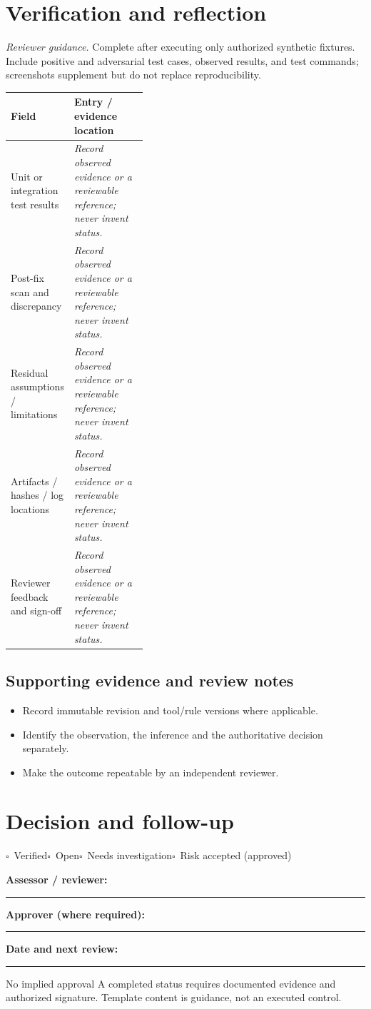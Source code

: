 \documentclass[10pt,letterpaper]{article}
\newcommand{\checkbox}{\(\square\)}
\newcommand{\blankline}{\noindent\rule{\linewidth}{0.35pt}\par\vspace{4pt}}
\begin{document}
\section{Verification and reflection}
\textit{Reviewer guidance.} Complete after executing only authorized synthetic fixtures. Include positive and adversarial test cases, observed results, and test commands; screenshots supplement but do not replace reproducibility.
\begin{tabularx}{\linewidth}{@{}p{0.38\linewidth}Y@{}}
\toprule Field & Entry / evidence location\\\midrule
Unit or integration test results & \textit{Record observed evidence or a reviewable reference; never invent status.}\\[1.0em]
\midrule
Post-fix scan and discrepancy & \textit{Record observed evidence or a reviewable reference; never invent status.}\\[1.0em]
\midrule
Residual assumptions / limitations & \textit{Record observed evidence or a reviewable reference; never invent status.}\\[1.0em]
\midrule
Artifacts / hashes / log locations & \textit{Record observed evidence or a reviewable reference; never invent status.}\\[1.0em]
\midrule
Reviewer feedback and sign-off & \textit{Record observed evidence or a reviewable reference; never invent status.}\\[1.0em]
\midrule
\end{tabularx}
\subsection{Supporting evidence and review notes}
\begin{itemize}
\item Record immutable revision and tool/rule versions where applicable.
\item Identify the observation, the inference and the authoritative decision separately.
\item Make the outcome repeatable by an independent reviewer.
\end{itemize}
\clearpage
\section{Decision and follow-up}
\noindent\checkbox\ Verified\quad\checkbox\ Open\quad\checkbox\ Needs investigation\quad\checkbox\ Risk accepted (approved)\par
\noindent\textbf{Assessor / reviewer:}\par\blankline\textbf{Approver (where required):}\par\blankline\textbf{Date and next review:}\par\blankline
\begin{warnbox}{No implied approval}
A completed status requires documented evidence and authorized signature. Template content is guidance, not an executed control.\end{warnbox}
\end{document}
